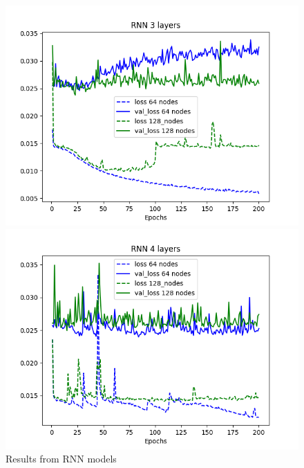 \documentclass[11pt]
{article}
\begin{document}
\begin{figure}[H]
\begin{minipage}[b]{0.33\linewidth}
		\includegraphics[width=\linewidth]{../TESTS_RESULTS/RNN_tests/plots/3_comp.png} 
	\end{minipage}%
	\begin{minipage}[b]{0.33\linewidth}
		\centering
		\includegraphics[width=\linewidth]{../TESTS_RESULTS/RNN_tests/plots/4_comp.png} 
	\end{minipage} 
	\caption{Results from RNN models} 
\label{fig:RNNplots}
\end{figure}
\end{document}
